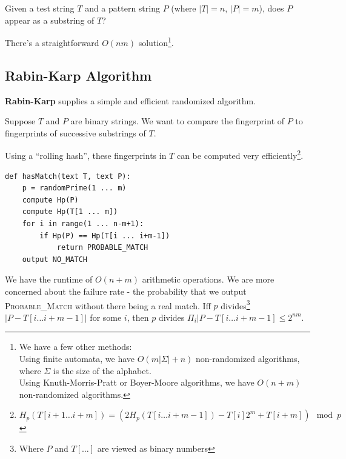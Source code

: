                 Given a test string $T$ and a pattern string $P$ (where $|T| = n$, $|P| = m$), does $P$ appear as a substring of $T$?

                There's a straightforward $O(nm)$ solution\footnote{We have a few other methods:\\
                Using finite automata, we have $O(m|\Sigma| + n)$ non-randomized algorithms, where $\Sigma$ is the size of the alphabet. \\
                Using Knuth-Morris-Pratt or Boyer-Moore algorithms, we have $O(n+m)$ non-randomized algorithms.}.

                \subsection{Rabin-Karp Algorithm} %
                \label{sub:rabin_karp_algorithm}

                    \textbf{Rabin-Karp} supplies a simple and efficient randomized algorithm.

                    Suppose $T$ and $P$ are binary strings.
                    We want to compare the fingerprint of $P$ to fingerprints of successive substrings of $T$.

                    Using a ``rolling hash'', these fingerprints in $T$ can be computed very efficiently\footnote{$H_p(T[i+1 \ldots i+m]) = (2 H_p(T[i \ldots i+m - 1]) - T[i] 2^m + T[i + m]) \mod p $}.

                    \begin{lstlisting}
def hasMatch(text T, text P):
    p = randomPrime(1 ... m)
    compute Hp(P)
    compute Hp(T[1 ... m])
    for i in range(1 ... n-m+1):
        if Hp(P) == Hp(T[i ... i+m-1])
            return PROBABLE_MATCH
    output NO_MATCH
                    \end{lstlisting}
                    We have the runtime of $O(n + m)$ arithmetic operations.
                    We are more concerned about the failure rate - the probability that we output \textsc{Probable\_Match} without there being a real match.
                    Iff $p$ divides\footnote{Where $P$ and $T[\ldots]$ are viewed as binary numbers} $|P - T[i \ldots i+m -1]|$ for some $i$, then $p$ divides $\Pi_i |P - T[i \ldots i+m - 1] \le 2^{nm}$.

